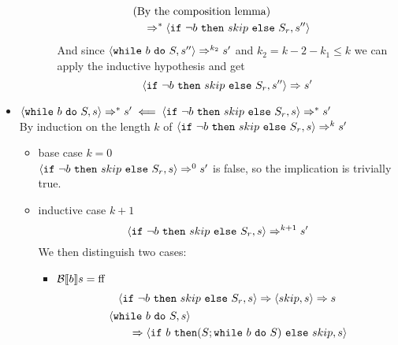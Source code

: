 \begin{exercise}
\begin{itemize}
\begin{itemize}
\begin{itemize}
\begin{align*}
                            \\&\text{(By the composition lemma)}
                            \\&\quad\Rightarrow^* \instr{\texttt{if}\ \neg b\ \texttt{then}\ skip\ \texttt{else}\ S_r}{s''}
                        \end{align*}
                        And since $\left<\texttt{while}\ b\ \texttt{do}\ S, s''\right> \Rightarrow^{k_2} s'$ and $k_2 = k - 2 - k_1 \leq k$  we can apply the inductive hypothesis and get
                        \[ \instr{\texttt{if}\ \neg b\ \texttt{then}\ skip\ \texttt{else}\ S_r}{s''} \Rightarrow s' \]
                \end{itemize}
            \end{itemize}
        \item $\instr{\texttt{while}\ b\ \texttt{do}\ S}{s} \Rightarrow^* s' \impliedby \instr{\texttt{if}\ \neg b\ \texttt{then}\ skip\ \texttt{else}\ S_r}{s} \Rightarrow^* s'$ \\
            By induction on the length $k$ of $\instr{\texttt{if}\ \neg b\ \texttt{then}\ skip\ \texttt{else}\ S_r}{s} \Rightarrow^k s'$
            \begin{itemize}
                \item base case $k=0$ \\
                $\instr{\texttt{if}\ \neg b\ \texttt{then}\ skip\ \texttt{else}\ S_r}{s} \Rightarrow^0 s'$ is false, so the implication is trivially true.
                \item inductive case $k+1$ \vspace*{-0.3cm}
                \[ \instr{\texttt{if}\ \neg b\ \texttt{then}\ skip\ \texttt{else}\ S_r}{s} \Rightarrow^{k+1} s' \]
                We then distinguish two cases:
                \begin{itemize}
                    \item $\mathcal{B} \llbracket  b \rrbracket s = \text{ff}$
                    \begin{gather*}
                        \instr{\texttt{if}\ \neg b\ \texttt{then}\ skip\ \texttt{else}\ S_r}{s}
                        \Rightarrow
                        \instr{skip}{s}
                        \Rightarrow s
                        \\
                        \begin{align*}
                            &\instr{\texttt{while}\ b\ \texttt{do}\ S}{s}
                            \\&\qquad\Rightarrow \instr{\texttt{if}\ b\ \texttt{then} (S; \texttt{while}\ b\ \texttt{do}\ S)\ \texttt{else}\ skip}{s}

\end{align*}
\end{gather*}
\end{itemize}
\end{itemize}
\end{itemize}
\end{exercise}
